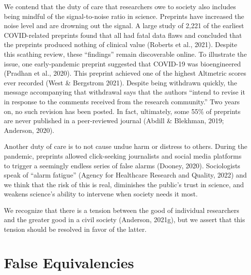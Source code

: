 \documentclass[authordate, perspective, issue]{jote-new-article}
\begin{document}
	We contend that the duty of care that researchers owe to society also includes being mindful of the signal-to-noise ratio in science. Preprints have increased the noise level and are drowning out the signal. A large study of 2,221 of the earliest COVID-related preprints found that all had fatal data flaws and concluded that the preprints produced nothing of clinical value (Roberts et al., 2021). Despite this scathing review, these “findings” remain discoverable online. To illustrate the issue, one early-pandemic preprint suggested that COVID-19 was bioengineered (Pradhan et al., 2020). This preprint achieved one of the highest Altmetric scores ever recorded (West \& Bergstrom 2021). Despite being withdrawn quickly, the message accompanying that withdrawal says that the authors “intend to revise it in response to the comments received from the research community.” Two years on, no such revision has been posted. In fact, ultimately, some 55\% of preprints are never published in a peer-reviewed journal (Abdill \& Blekhman, 2019; Anderson, 2020).







	Another duty of care is to not cause undue harm or distress to others. During the pandemic, preprints allowed click-seeking journalists and social media platforms to trigger a seemingly endless series of false alarms (Dooney, 2020). Sociologists speak of “alarm fatigue” (Agency for Healthcare Research and Quality, 2022) and we think that the risk of this is real, diminishes the public's trust in science, and weakens science's ability to intervene when society needs it most.







	We recognize that there is a tension between the good of individual researchers and the greater good in a civil society (Anderson, 2021g), but we assert that this tension should be resolved in favor of the latter.







	\section{False Equivalencies}
\end{document}
